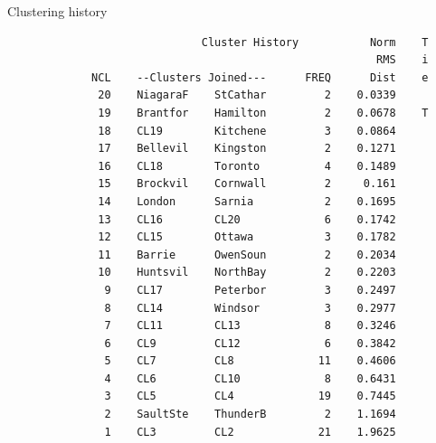 \documentclass[pdf]{prosper}
\begin{document}
\begin{slide}{Clustering history}

{\scriptsize
\begin{verbatim}
                              Cluster History           Norm    T
                                                         RMS    i
             NCL    --Clusters Joined---      FREQ      Dist    e
              20    NiagaraF    StCathar         2    0.0339     
              19    Brantfor    Hamilton         2    0.0678    T
              18    CL19        Kitchene         3    0.0864     
              17    Bellevil    Kingston         2    0.1271     
              16    CL18        Toronto          4    0.1489     
              15    Brockvil    Cornwall         2     0.161     
              14    London      Sarnia           2    0.1695     
              13    CL16        CL20             6    0.1742     
              12    CL15        Ottawa           3    0.1782     
              11    Barrie      OwenSoun         2    0.2034     
              10    Huntsvil    NorthBay         2    0.2203     
               9    CL17        Peterbor         3    0.2497     
               8    CL14        Windsor          3    0.2977     
               7    CL11        CL13             8    0.3246     
               6    CL9         CL12             6    0.3842     
               5    CL7         CL8             11    0.4606     
               4    CL6         CL10             8    0.6431     
               3    CL5         CL4             19    0.7445     
               2    SaultSte    ThunderB         2    1.1694     
               1    CL3         CL2             21    1.9625     

\end{verbatim}
}
  
\end{slide}
\end{document}
